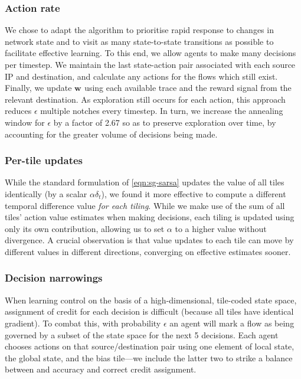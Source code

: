 \documentclass[10pt, times, comsoc]{IEEEtran}
\newcommand{\wvec}[1]{\ensuremath{\bm{w}_{#1}}}
\begin{document}
\subsubsection{Action rate}
We chose to adapt the algorithm to prioritise rapid response to changes in network state and to visit as many state-to-state transitions as possible to facilitate effective learning.
To this end, we allow agents to make many decisions per timestep.
We maintain the last state-action pair associated with each source IP and destination, and calculate any actions for the flows which still exist.
Finally, we update $\wvec{}$ using each available trace and the reward signal from the relevant destination.
As exploration still occurs for each action, this approach reduces $\epsilon$ multiple notches every timestep.
In turn, we increase the annealing window for $\epsilon$ by a factor of \num{2.67} so as to preserve exploration over time, by accounting for the greater volume of decisions being made.

\subsubsection{Per-tile updates}
While the standard formulation of \cref{eqn:sg-sarsa} updates the value of all tiles identically (by a scalar $\alpha \delta_t$), we found it more effective to compute a different temporal difference value \emph{for each tiling}.
While we make use of the sum of all tiles' action value estimates when making decisions, each tiling is updated using only its own contribution, allowing us to set $\alpha$ to a higher value without divergence.
A crucial observation is that value updates to each tile can move by different values in different directions, converging on effective estimates sooner.

\subsubsection{Decision narrowings}
When learning control on the basis of a high-dimensional, tile-coded state space, assignment of credit for each decision is difficult (because all tiles have identical gradient).
To combat this, with probability $\epsilon$ an agent will mark a flow as being governed by a subset of the state space for the next 5 decisions.
Each agent chooses actions on that source/destination pair using one element of local state, the global state, and the bias tile---we include the latter two to strike a balance between and accuracy and correct credit assignment.
\end{document}
